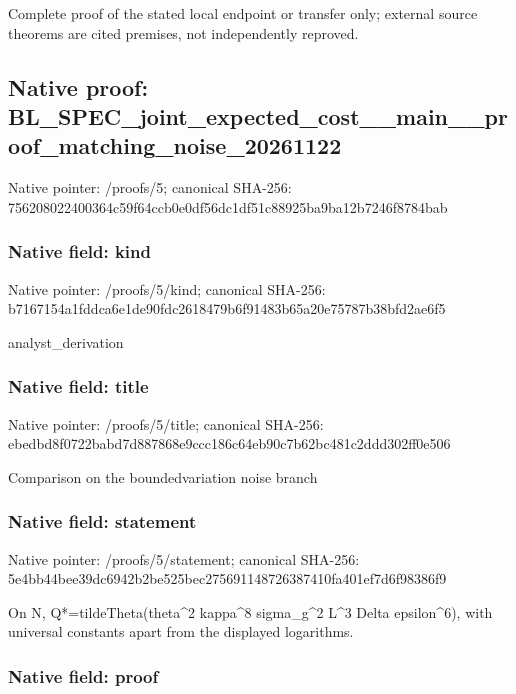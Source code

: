 \documentclass[10pt,a4paper]{article}
\begin{document}
Complete proof of the stated local endpoint or transfer only; external source theorems are cited premises, not independently reproved.


\subsection{Native proof: BL\_SPEC\_joint\_expected\_c\allowbreak{}ost\_\_main\_\_proof\_matchin\allowbreak{}g\_noise\_20261122}


Native pointer: /proofs/5; canonical SHA-256: 756208022400364c59f64ccb\allowbreak{}0e0df56dc1df51c88925ba9b\allowbreak{}a12b7246f8784bab



\subsubsection{Native field: kind}


Native pointer: /proofs/5/kind; canonical SHA-256: b7167154a1fddca6e1de90fd\allowbreak{}c2618479b6f91483b65a20e7\allowbreak{}5787b38bfd2ae6f5


analyst\_derivation


\subsubsection{Native field: title}


Native pointer: /proofs/5/title; canonical SHA-256: ebedbd8f0722babd7d887868\allowbreak{}e9ccc186c64eb90c7b62bc48\allowbreak{}1c2ddd302ff0e506


Comparison on the boundedvariation noise branch


\subsubsection{Native field: statement}


Native pointer: /proofs/5/statement; canonical SHA-256: 5e4bb44bee39dc6942b2be52\allowbreak{}5bec275691148726387410fa\allowbreak{}401ef7d6f98386f9


On N, Q*=tildeTheta(theta\textasciicircum{}2 kappa\textasciicircum{}8 sigma\_g\textasciicircum{}2 L\textasciicircum{}3 Delta epsilon\textasciicircum{}6), with universal constants apart from the displayed logarithms.


\subsubsection{Native field: proof}
\end{document}
